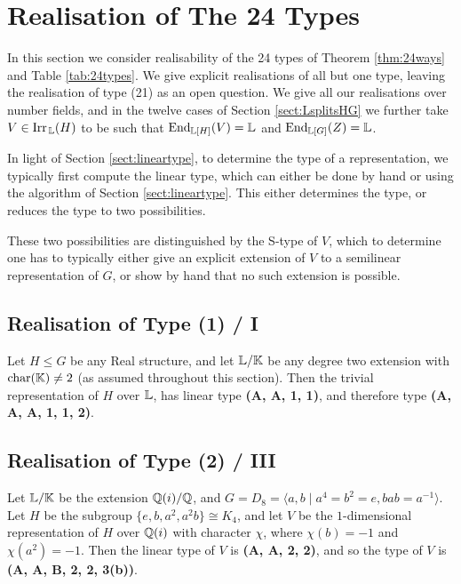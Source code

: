 \section{Realisation of The 24 Types}\label{sect:realise24ways}

In this section we consider realisability of the 24 types of Theorem \ref{thm:24ways} and Table \ref{tab:24types}. We give explicit realisations of all but one type, leaving the realisation of type (21) as an open question. We give all our realisations over number fields, and in the twelve cases of Section \ref{sect:LsplitsHG} we further take $V \in \operatorname{Irr}_{\, {\mathbb L}}(H)$ to be such that $\operatorname{End}_{{\mathbb L}[H]}(V) = {\mathbb L}$ and $\operatorname{End}_{{\mathbb L}[G]}(Z) = {\mathbb L}$.

In light of Section \ref{sect:lineartype}, to determine the type of a representation, we typically first compute the linear type, which can either be done by hand or using the algorithm of Section \ref{sect:lineartype}. This either determines the type, or reduces the type to two possibilities.

These two possibilities are distinguished by the S-type of $V$, which to determine one has to typically either give an explicit extension of $V$ to a semilinear representation of $G$, or show by hand that no such extension is possible.

\subsection{Realisation of Type (1) / I}

Let $H \leq G$ be any Real structure, and let ${\mathbb L} / {\mathbb K}$ be any degree two extension with $\operatorname{char}({\mathbb K}) \neq 2$ (as assumed throughout this section). Then the trivial representation of $H$ over ${\mathbb L}$, has linear type \textbf{(A, A, 1, 1)}, and therefore type \textbf{(A, A, A, 1, 1, 2)}.

\subsection{Realisation of Type (2) / III}

Let ${\mathbb L} / {\mathbb K}$ be the extension ${\mathbb Q}(i) / {\mathbb Q}$, and $G = D_8 = \langle a,b \mid a^4 = b^2 = e, bab = a^{-1} \rangle$. Let $H$ be the subgroup $\{e, b, a^2, a^2 b\} \cong K_4$, and let $V$ be the $1$-dimensional representation of $H$ over ${\mathbb Q}(i)$ with character $\chi$, where $\chi(b) = -1$ and $\chi(a^2) = -1$. Then the linear type of $V$ is \textbf{(A, A, 2, 2)}, and so the type of $V$ is \textbf{(A, A, B, 2, 2, 3(b))}.

